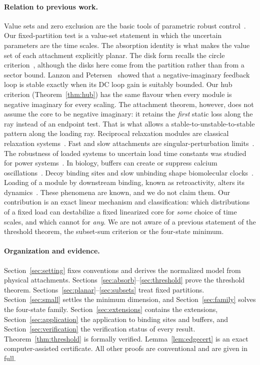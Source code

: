 \documentclass[11pt,a4paper]{article}
\theoremstyle{plain}
\theoremstyle{definition}
\theoremstyle{remark}
\begin{document}
\paragraph{Relation to previous work.}
Value sets and zero exclusion are the basic tools of parametric robust
control~\cite{barmish1994}. Our fixed-partition test is a value-set statement
in which the uncertain parameters are the time scales. The absorption identity
is what makes the value set of each attachment explicitly planar. The disk
form recalls the circle criterion~\cite{zames1966}, although the disks here
come from the partition rather than from a sector bound. Lanzon and
Petersen~\cite{lanzon2008,xiong2010,petersen2010} showed that a
negative-imaginary feedback loop is stable exactly when its DC loop gain is
suitably bounded. Our hub criterion (Theorem~\ref{thm:hub}) has the same
flavour when every module is negative imaginary for every scaling. The
attachment theorem, however, does not assume the core to be negative
imaginary: it retains the \emph{first} static loss along the ray instead of an
endpoint test. That is what allows a stable-to-unstable-to-stable pattern
along the loading ray. Reciprocal relaxation modules are classical relaxation
systems~\cite{willems1976,chaffey2023}. Fast and slow attachments are
singular-perturbation limits~\cite{kokotovic1999}. The robustness of loaded
systems to uncertain load time constants was studied for power
systems~\cite{nguyen2014}. In biology, buffers can create or suppress calcium
oscillations~\cite{falcke2003,gin2006}. Decoy binding sites and slow unbinding
shape biomolecular clocks~\cite{karapetyan2015,dey2021}. Loading of a module by
downstream binding, known as retroactivity, alters its
dynamics~\cite{delvecchio2008,jayanthi2013}. These phenomena are known, and we
do not claim them. Our contribution is an exact linear mechanism and
classification: which distributions of a fixed load can destabilize a fixed
linearized core for \emph{some} choice of time scales, and which cannot for
\emph{any}. We are not aware of a previous statement of the threshold theorem,
the subset-sum criterion or the four-state minimum.

\paragraph{Organization and evidence.}
Section~\ref{sec:setting} fixes conventions and derives the normalized model
from physical attachments. Sections~\ref{sec:absorb}--\ref{sec:threshold}
prove the threshold theorem. Sections~\ref{sec:planar}--\ref{sec:subsets}
treat fixed partitions. Section~\ref{sec:small} settles the minimum
dimension, and Section~\ref{sec:family} solves the four-state family.
Section~\ref{sec:extensions} contains the extensions,
Section~\ref{sec:application} the application to binding sites and buffers,
and Section~\ref{sec:verification} the verification status of every result.
Theorem~\ref{thm:threshold} is formally verified. Lemma~\ref{lem:edgecert}
is an exact computer-assisted certificate. All other proofs are
conventional and are given in full.
\end{document}
